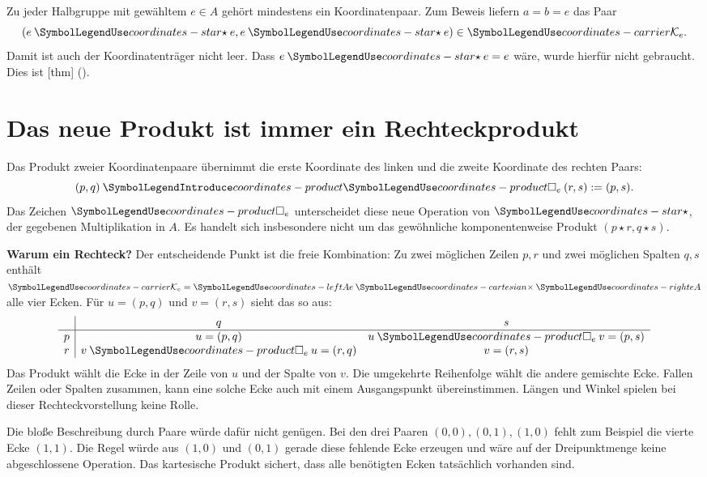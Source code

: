 Zu jeder Halbgruppe mit gewähltem \(e\in A\) gehört mindestens
ein Koordinatenpaar. Zum Beweis liefern \(a=b=e\) das Paar
\[
  (e\CRStar e,e\CRStar e)\in\CRK.
\]
Damit ist auch der Koordinatenträger nicht leer. Dass
\(e\CRStar e=e\) wäre, wurde hierfür nicht gebraucht.
Dies ist [thm]
().

\section*{Das neue Produkt ist immer ein Rechteckprodukt}
\hypertarget{coordinates.reading.product}{}

Das Produkt zweier Koordinatenpaare übernimmt die erste Koordinate
des linken und die zweite Koordinate des rechten Paars:
\[
  (p,q)\CRBin*{coordinates-product}{\square_e}(r,s):=(p,s).
\]
Das Zeichen \(\CRSquare\) unterscheidet diese
neue Operation von \(\CRStar\), der gegebenen Multiplikation in
\(A\). Es handelt sich insbesondere nicht um das gewöhnliche
komponentenweise Produkt \((p\star r,q\star s)\).

\medskip\noindent\textbf{Warum ein Rechteck?}
Der entscheidende Punkt ist die freie Kombination: Zu zwei möglichen
Zeilen \(p,r\) und zwei möglichen Spalten \(q,s\) enthält
\(\CRK=\CRLeft\CRTimes\CRRight\) alle vier Ecken.
Für \(u=(p,q)\) und \(v=(r,s)\) sieht das so aus:
\[
 \begin{array}{c|cc}
     &q&s\\\hline
  p&u=(p,q)&u\CRSquare v=(p,s)\\
  r&v\CRSquare u=(r,q)&v=(r,s)
 \end{array}
\]
Das Produkt wählt die Ecke in der Zeile von \(u\) und der
Spalte von \(v\). Die umgekehrte Reihenfolge wählt die andere
gemischte Ecke. Fallen Zeilen oder Spalten zusammen, kann eine
solche Ecke auch mit einem Ausgangspunkt übereinstimmen.
Längen und Winkel spielen bei dieser Rechteckvorstellung keine Rolle.

Die bloße Beschreibung durch Paare würde dafür nicht genügen.
Bei den drei Paaren \((0,0),(0,1),(1,0)\) fehlt zum Beispiel
die vierte Ecke \((1,1)\). Die Regel würde aus \((1,0)\) und
\((0,1)\) gerade diese fehlende Ecke erzeugen und wäre auf der
Dreipunktmenge keine abgeschlossene Operation. Das kartesische
Produkt sichert, dass alle benötigten Ecken tatsächlich vorhanden sind.

